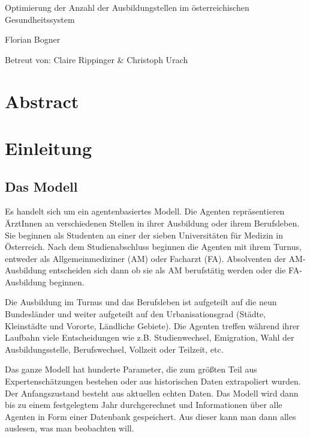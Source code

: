 \documentclass[a4paper,12pt]{article}
\begin{document}
\begin{titlepage}
\huge
\centering
Optimierung der Anzahl der Ausbildungstellen im österreichischen Gesundheitssystem 

\vfill

\normalsize
Florian Bogner

Betreut von: Claire Rippinger \& Christoph Urach
\end{titlepage}




\tableofcontents
\newpage

\section{Abstract}

\section{Einleitung}



\subsection{Das Modell}

Es handelt sich um ein agentenbasiertes Modell. Die Agenten repräsentieren ÄrztInnen an verschiedenen Stellen in ihrer Ausbildung oder ihrem Berufsleben. Sie beginnen als Studenten an einer der sieben Universitäten für Medizin in Österreich. Nach dem Studienabschluss beginnen die Agenten mit ihrem Turnus, entweder als Allgemeinmediziner (AM) oder Facharzt (FA). Absolventen der AM-Ausbildung entscheiden sich dann ob sie als AM berufstätig werden oder die FA-Ausbildung beginnen. 

Die Ausbildung im Turnus und das Berufsleben ist aufgeteilt auf die neun Bundesländer und weiter aufgeteilt auf den Urbanisationsgrad (Städte, Kleinstädte und Vororte, Ländliche Gebiete). Die Agenten treffen während ihrer Laufbahn viele Entscheidungen wie z.B. Studienwechsel, Emigration, Wahl der Ausbildungsstelle, Berufswechsel, Vollzeit oder Teilzeit, etc. 

Das ganze Modell hat hunderte Parameter, die zum größten Teil aus Expertenschätzungen bestehen oder aus historischen Daten extrapoliert wurden. Der Anfangszustand besteht aus aktuellen echten Daten. Das Modell wird dann bis zu einem festgelegtem Jahr durchgerechnet und Informationen über alle Agenten in Form einer Datenbank gespeichert. Aus dieser kann man dann alles auslesen, was man beobachten will.
\end{document}
